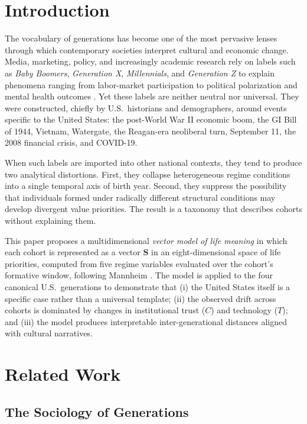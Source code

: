 \documentclass[conference]{IEEEtran}
\begin{document}
\section{Introduction}

The vocabulary of generations has become one of the most pervasive lenses through which contemporary societies interpret cultural and economic change. Media, marketing, policy, and increasingly academic research rely on labels such as \textit{Baby Boomers}, \textit{Generation X}, \textit{Millennials}, and \textit{Generation Z} to explain phenomena ranging from labor-market participation to political polarization and mental health outcomes \cite{mannheim1928,strauss1991,twenge2017}. Yet these labels are neither neutral nor universal. They were constructed, chiefly by U.S.\ historians and demographers, around events specific to the United States: the post-World War II economic boom, the GI Bill of 1944, Vietnam, Watergate, the Reagan-era neoliberal turn, September 11, the 2008 financial crisis, and COVID-19.

When such labels are imported into other national contexts, they tend to produce two analytical distortions. First, they collapse heterogeneous regime conditions into a single temporal axis of birth year. Second, they suppress the possibility that individuals formed under radically different structural conditions may develop divergent value priorities. The result is a taxonomy that describes cohorts without explaining them.

This paper proposes a multidimensional \textit{vector model of life meaning} in which each cohort is represented as a vector $\mathbf{S}$ in an eight-dimensional space of life priorities, computed from five regime variables evaluated over the cohort's formative window, following Mannheim \cite{mannheim1928}. The model is applied to the four canonical U.S.\ generations to demonstrate that (i) the United States itself is a specific case rather than a universal template; (ii) the observed drift across cohorts is dominated by changes in institutional trust ($C$) and technology ($T$); and (iii) the model produces interpretable inter-generational distances aligned with cultural narratives.

\section{Related Work}
\label{sec:related}

\subsection{The Sociology of Generations}
\end{document}
